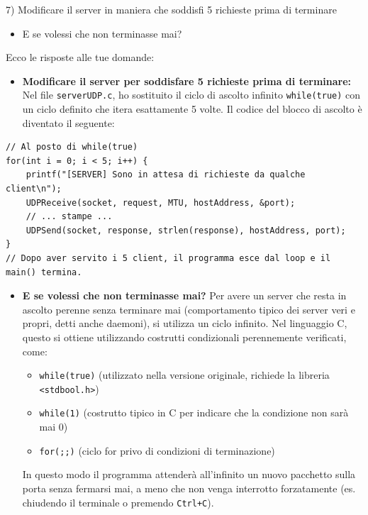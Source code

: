 \documentclass[11pt]{article}
\begin{document}
\begin{tcolorbox}[colback=blue!5!white,colframe=blue!75!black,title=\textbf{DOMANDA}, breakable]
7) Modificare il server in maniera che soddisfi 5 richieste prima di terminare
\begin{itemize}
    \item E se volessi che non terminasse mai?
\end{itemize}
\end{tcolorbox}

\begin{tcolorbox}[colback=green!5!white,colframe=green!75!black,title=\textbf{RISPOSTA}, breakable]
Ecco le risposte alle tue domande:

\begin{itemize}
    \item \textbf{Modificare il server per soddisfare 5 richieste prima di terminare:} Nel file \texttt{serverUDP.c}, ho sostituito il ciclo di ascolto infinito \texttt{while(true)} con un ciclo definito che itera esattamente 5 volte. Il codice del blocco di ascolto è diventato il seguente:
\end{itemize}

\begin{lstlisting}
// Al posto di while(true)
for(int i = 0; i < 5; i++) {
    printf("[SERVER] Sono in attesa di richieste da qualche client\n");
    UDPReceive(socket, request, MTU, hostAddress, &port);
    // ... stampe ...
    UDPSend(socket, response, strlen(response), hostAddress, port);
}
// Dopo aver servito i 5 client, il programma esce dal loop e il main() termina.
\end{lstlisting}

\begin{itemize}
    \item \textbf{E se volessi che non terminasse mai?} Per avere un server che resta in ascolto perenne senza terminare mai (comportamento tipico dei server veri e propri, detti anche daemoni), si utilizza un ciclo infinito. Nel linguaggio C, questo si ottiene utilizzando costrutti condizionali perennemente verificati, come:
    \begin{itemize}
        \item \texttt{while(true)} (utilizzato nella versione originale, richiede la libreria \texttt{<stdbool.h>})
        \item \texttt{while(1)} (costrutto tipico in C per indicare che la condizione non sarà mai 0)
        \item \texttt{for(;;)} (ciclo for privo di condizioni di terminazione)
    \end{itemize}
    In questo modo il programma attenderà all'infinito un nuovo pacchetto sulla porta senza fermarsi mai, a meno che non venga interrotto forzatamente (es. chiudendo il terminale o premendo \texttt{Ctrl+C}).
\end{itemize}
\end{tcolorbox}
\end{document}
